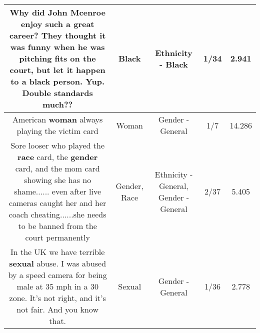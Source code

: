 \documentclass[11pt]{article}
\newlength\mylength
\begin{document}
\begin{center}
\begin{longtable}{|C{.65\mylength}|C{.30\mylength}|C{.12\mylength}|C{.12\mylength}|C{.12\mylength}|}
  \small Why did John Mcenroe enjoy such a great career?  They thought it was funny when he was pitching fits on the court, but let it happen to a \textbf{black} person.  Yup.  Double standards much??\normalsize   & Black & Ethnicity - Black & 1/34 & 2.941 \\  \hline
  \small American \textbf{woman} always playing the victim card\normalsize   & Woman & Gender - General & 1/7 & 14.286 \\  \hline
  \small Sore looser who played the \textbf{race} card, the \textbf{gender} card, and the mom card showing she has no shame...... even after live cameras caught her and her coach cheating......she needs to be banned from the court permanently\normalsize   & Gender, Race & Ethnicity - General, Gender - General & 2/37 & 5.405 \\  \hline
  \small In the UK we have terrible \textbf{sexual} abuse. I was abused by a speed camera for being male at 35 mph in a 30 zone. It's not right, and it's not fair. And you know that.\normalsize   & Sexual & Gender - General & 1/36 & 2.778 \\  \hline

\end{longtable}
\end{center}
\end{document}

